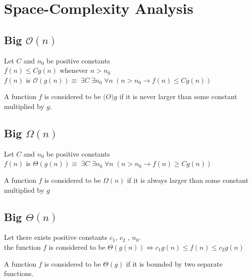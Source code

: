 \documentclass[a4paper]{article}
\newenvironment{definition}[1][Formal Definition]{\begin{trivlist}\item[\hskip \labelsep {\bfseries #1}]}{\end{trivlist}}
\newenvironment{indef}[1][Informal Definition]{\begin{trivlist}\item[\hskip \labelsep {\bfseries #1}]}{\end{trivlist}}
\begin{document}
\section{Space-Complexity Analysis}
\subsection{Big $\mathcal{O}(n)$} 
\begin{definition} Let $C$ and $n_0$ be positive constants  \\
$f(n) \leq Cg(n)$ whenever $n>n_0$\\
$f(n)$ is $ \mathcal{O}(g(n)) \equiv \; \exists C \; \exists n_0 \; \forall n \;(n > n_0 \rightarrow f(n) \leq Cg(n))$
\cite{Auckland}
\end{definition}
\begin{indef}
A function $f$ is considered to be $\mathcal(O){g}$ if it is never larger than some constant multiplied by $g$.
\end{indef}

\subsection{Big $\Omega(n)$}
\begin{definition}Let $C$ and $n_0$ be positive constants  \\
$f(n)$ is $ \Theta(g(n)) \equiv \; \exists C \; \exists n_0 \; \forall n \;(n > n_0 \rightarrow f(n) \geq Cg(n))$
\cite{Auckland}
\end{definition}
\begin{indef}
A function $f$ is considered to be $\Omega(n)$ if it is always larger than some constant multiplied by $g$	
\end{indef}

\subsection{Big $\Theta(n)$}
\begin{definition}
Let there exists positive constants $c_1$, $c_2$ , $n_0$.\\
the function $f$ is considered to be $\Theta(g(n)) \iff c_1g(n) \leq f(n) \leq c_2g(n)$
\cite{Auckland} 
\end{definition}
\begin{indef}
A function $f$ is considered to be $\Theta(g)$ if it is bounded by two separate functions.	
\end{indef}
\end{document}
